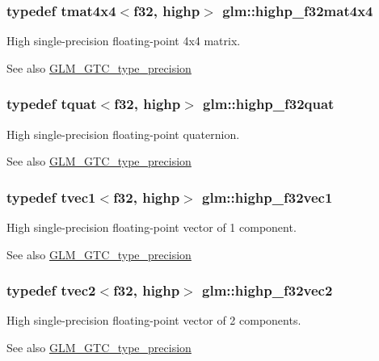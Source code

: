 \subsubsection[{highp\+\_\+f32mat4x4}]{\setlength{\rightskip}{0pt plus 5cm}typedef tmat4x4$<${\bf f32}, highp$>$ {\bf glm\+::highp\+\_\+f32mat4x4}}\label{namespaceglm_a843cbcb73e74d599cdbadc97d0478539}
High single-\/precision floating-\/point 4x4 matrix. \begin{DoxySeeAlso}{See also}
\hyperlink{group__gtc__type__precision}{G\+L\+M\+\_\+\+G\+T\+C\+\_\+type\+\_\+precision} 
\end{DoxySeeAlso}
\hypertarget{namespaceglm_af8fed7ddfeb05fe07ba9d661644b8a47}{}
\subsubsection[{highp\+\_\+f32quat}]{\setlength{\rightskip}{0pt plus 5cm}typedef {\bf tquat}$<${\bf f32}, highp$>$ {\bf glm\+::highp\+\_\+f32quat}}\label{namespaceglm_af8fed7ddfeb05fe07ba9d661644b8a47}
High single-\/precision floating-\/point quaternion. \begin{DoxySeeAlso}{See also}
\hyperlink{group__gtc__type__precision}{G\+L\+M\+\_\+\+G\+T\+C\+\_\+type\+\_\+precision} 
\end{DoxySeeAlso}
\hypertarget{namespaceglm_a8521171274ff387f66c871c8eeeab719}{}
\subsubsection[{highp\+\_\+f32vec1}]{\setlength{\rightskip}{0pt plus 5cm}typedef tvec1$<${\bf f32}, highp$>$ {\bf glm\+::highp\+\_\+f32vec1}}\label{namespaceglm_a8521171274ff387f66c871c8eeeab719}
High single-\/precision floating-\/point vector of 1 component. \begin{DoxySeeAlso}{See also}
\hyperlink{group__gtc__type__precision}{G\+L\+M\+\_\+\+G\+T\+C\+\_\+type\+\_\+precision} 
\end{DoxySeeAlso}
\hypertarget{namespaceglm_a4c290649029a7243cd9153f8411d5c40}{}
\subsubsection[{highp\+\_\+f32vec2}]{\setlength{\rightskip}{0pt plus 5cm}typedef tvec2$<${\bf f32}, highp$>$ {\bf glm\+::highp\+\_\+f32vec2}}\label{namespaceglm_a4c290649029a7243cd9153f8411d5c40}
High single-\/precision floating-\/point vector of 2 components. \begin{DoxySeeAlso}{See also}
\hyperlink{group__gtc__type__precision}{G\+L\+M\+\_\+\+G\+T\+C\+\_\+type\+\_\+precision} 
\end{DoxySeeAlso}
\hypertarget{namespaceglm_a23c60c992dfe341ba66054986f935278}{}
